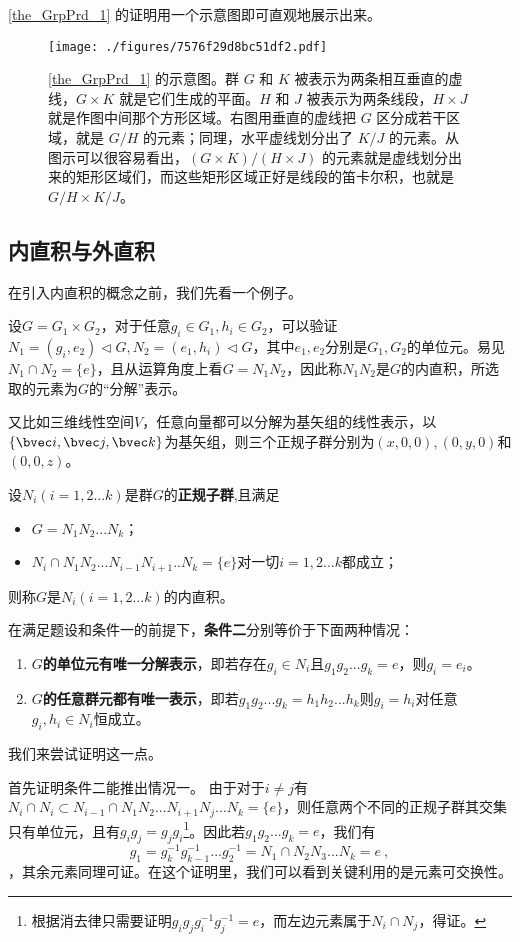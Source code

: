 \autoref{the_GrpPrd_1} 的证明用一个示意图即可直观地展示出来。

\begin{figure}[ht]
\centering
\texttt{[image: ./figures/7576f29d8bc51df2.pdf]}
\caption{\autoref{the_GrpPrd_1} 的示意图。群 $G$ 和 $K$ 被表示为两条相互垂直的虚线，$G\times K$ 就是它们生成的平面。$H$ 和 $J$ 被表示为两条线段，$H\times J$ 就是作图中间那个方形区域。右图用垂直的虚线把 $G$ 区分成若干区域，就是 $G/H$ 的元素；同理，水平虚线划分出了 $K/J$ 的元素。从图示可以很容易看出，$(G\times K)/(H\times J)$ 的元素就是虚线划分出来的矩形区域们，而这些矩形区域正好是线段的笛卡尔积，也就是 $G/H\times K/J$。} \label{fig_GrpPrd_1}
\end{figure}
\subsection{内直积与外直积}
在引入内直积的概念之前，我们先看一个例子。

设$G=G_1\times G_2$，对于任意$g_i\in G_1,h_i\in G_2$，可以验证$N_1=(g_i,e_2)\vartriangleleft G,N_2=(e_1,h_i)\vartriangleleft G$，其中$e_1,e_2$分别是$G_1,G_2$的单位元。易见$N_1\cap N_2=\{e\}$，且从运算角度上看$G=N_1N_2$，因此称$N_1N_2$是$G$的内直积，所选取的元素为$G$的“分解”表示。

又比如三维线性空间$V$，任意向量都可以分解为基矢组的线性表示，以$\{\bvec i,\bvec j,\bvec k\}$为基矢组，则三个正规子群分别为$(x,0,0),(0,y,0)$和$(0,0,z)$。
\begin{definition}{}
设$N_i(i=1,2...k)$是群$G$的\textbf{正规子群},且满足
\begin{itemize}
\item $G=N_1N_2...N_k$；
\item $N_i\cap N_1N_2...N_{i-1}N_{i+1}..N_k=\{e\}$对一切$i=1,2...k$都成立；
\end{itemize}
则称$G$是$N_i(i=1,2...k)$的内直积。
\end{definition}
在满足题设和条件一的前提下，\textbf{条件二}分别等价于下面两种情况：
\begin{enumerate}
\item \textbf{$G$的单位元有唯一分解表示}，即若存在$g_i\in N_i$且$g_1g_2...g_k=e$，则$g_i=e_i$。
\item \textbf{$G$的任意群元都有唯一表示}，即若$g_1g_2...g_k=h_1h_2...h_k$则$g_i=h_i$对任意$g_i,h_i\in N_i$恒成立。
\end{enumerate}
我们来尝试证明这一点。

首先证明条件二能推出情况一。
由于对于$i\neq j$有$N_i\cap N_i\subset N_{i-1}\cap N_1N_2...N_{i+1}N_j...N_k=\{e\}$，则任意两个不同的正规子群其交集只有单位元，且有$g_ig_j=g_jg_i$\footnote{根据消去律只需要证明$g_ig_jg_i^{-1}g_j^{-1}=e$，而左边元素属于$N_i\cap N_j$，得证。}。因此若$g_1g_2...g_k=e$，我们有
\begin{equation}
g_1=g_k^{-1}g_{k-1}^{-1}...g_2^{-1}=N_1\cap N_2N_3...N_k=e~,
\end{equation}
，其余元素同理可证。在这个证明里，我们可以看到关键利用的是元素可交换性。

